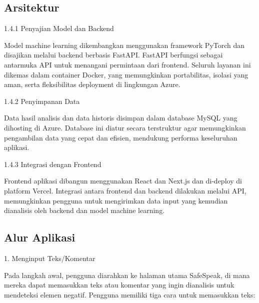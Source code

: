 \documentclass[journal,article,submit,pdftex,moreauthors]{Definitions/mdpi}
\begin{document}
\subsection{Arsitektur} 

\item \hspace{1cm}	1.4.1 Penyajian Model dan Backend

\begin{adjustwidth}{2em}{0pt} \hspace{1cm} Model machine learning dikembangkan menggunakan framework PyTorch dan disajikan melalui backend berbasis FastAPI. FastAPI berfungsi sebagai antarmuka API untuk menangani permintaan dari frontend. Seluruh layanan ini dikemas dalam container Docker, yang memungkinkan portabilitas, isolasi yang aman, serta fleksibilitas deployment di lingkungan Azure.\end{adjustwidth}

\item \hspace{1cm}	1.4.2 Penyimpanan Data

\begin{adjustwidth}{2em}{0pt} \hspace{1cm} Data hasil analisis dan data historis disimpan dalam database MySQL yang dihosting di Azure. Database ini diatur secara terstruktur agar memungkinkan pengambilan data yang cepat dan efisien, mendukung performa keseluruhan aplikasi. \end{adjustwidth}

\item \hspace{1cm}	1.4.3 Integrasi dengan Frontend

\begin{adjustwidth}{2em}{0pt}Frontend aplikasi dibangun menggunakan React dan Next.js dan di-deploy di platform Vercel. Integrasi antara frontend dan backend dilakukan melalui API, memungkinkan pengguna untuk mengirimkan data input yang kemudian dianalisis oleh backend dan model machine learning.\end{adjustwidth}

\subsection{Alur Aplikasi} 
\item 1. Menginput Teks/Komentar

Pada langkah awal, pengguna diarahkan ke halaman utama SafeSpeak, di mana mereka dapat memasukkan teks atau komentar yang ingin dianalisis untuk mendeteksi elemen negatif. 
Pengguna memiliki tiga cara untuk memasukkan teks:
\end{document}
